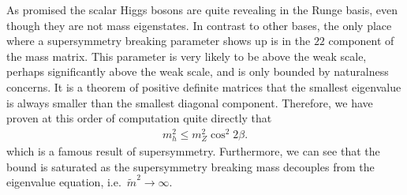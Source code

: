 \documentclass[12pt]{article}
\def\beq{\begin{eqnarray}}
\def\eeq{\end{eqnarray}}
\begin{document}
As promised the scalar Higgs bosons are quite revealing in the  Runge basis, even though they are not mass eigenstates.  In contrast to other bases, the only place where a supersymmetry breaking parameter shows up is in the $22$ component of the mass matrix. This parameter is very likely to be above the weak scale, perhaps significantly above the weak scale, and is only bounded by naturalness concerns.  It is a theorem of positive definite matrices that the smallest eigenvalue is always smaller than the smallest diagonal component. Therefore, we have proven at this order of computation quite directly that
\beq
m^2_h\leq m^2_Z\cos^2 2\beta.
\eeq
which is a famous result of supersymmetry. Furthermore, we can see that the bound is saturated as the supersymmetry breaking mass decouples from the eigenvalue equation, i.e.\ $\tilde m^2\to \infty$.
\end{document}
